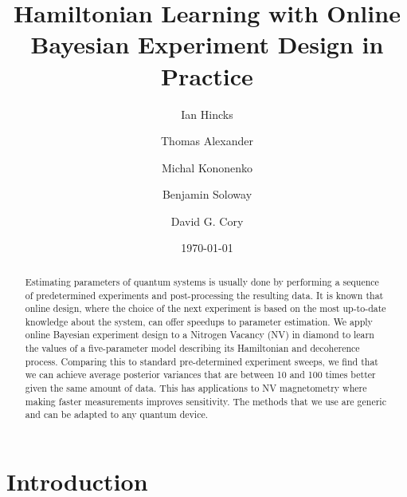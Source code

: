 \documentclass[aps,nofootinbib,twocolumn,superscriptaddress]{revtex4}
\begin{document}
\title{Hamiltonian Learning with Online Bayesian Experiment Design in Practice}

\author{Ian Hincks}
\affilUWAMath
\affilIQC

\author{Thomas Alexander}
\affilUWPhys
\affilIQC

\author{Michal Kononenko}
\affilIQC
\affilUWChemEng

\author{Benjamin Soloway}
\affilIQC
\affilHaverford

\author{David G. Cory}
\affilUWChem
\affilIQC
\affilPI
\affilCIFAR


\date{\today}

\begin{abstract}
Estimating parameters of quantum systems is usually done by performing
a sequence of predetermined experiments and post-processing the resulting data.
It is known that online design, where the
choice of the next experiment is based on
the most up-to-date knowledge about the system,
can offer speedups to parameter estimation.
We apply online Bayesian experiment design to a Nitrogen
Vacancy (NV) in diamond to learn the values of a
five-parameter model describing its Hamiltonian and decoherence process.
Comparing this to standard pre-determined experiment sweeps,
we find that we can achieve average posterior variances that are
between 10 and 100 times better given the same amount of data.
This has applications to NV magnetometry where making faster measurements
improves sensitivity.
The methods that we use are generic and can be
adapted to any quantum device.
\end{abstract}

\maketitle




\section{Introduction}
\label{sec:intro}
\end{document}
